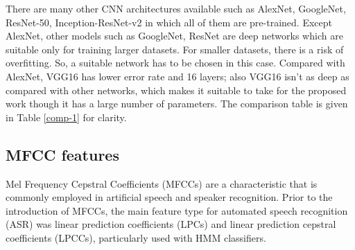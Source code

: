 \documentclass[pdflatex]{sn-jnl}%
\theoremstyle{thmstyleone}%
\theoremstyle{thmstyletwo}%
\theoremstyle{thmstylethree}%
\begin{document}
There are many other CNN architectures available such as AlexNet, GoogleNet, ResNet-50, Inception-ResNet-v2 in which all of them are pre-trained. Except AlexNet, other models such as GoogleNet, ResNet are deep networks which are suitable only for training larger datasets. For smaller datasets, there is a risk of overfitting. So, a suitable network has to be chosen in this case. Compared with AlexNet, VGG16 has lower error rate and 16 layers; also VGG16 isn't as deep as compared with other networks, which makes it suitable to take for the proposed work though it has a large number of parameters. The comparison table is given in Table \ref{comp-1} for clarity. 

\begin{table}[!htp]
	\caption{Comparision of CNN architectures}
	\begin{center}
		\label{comp-1}
	\end{center}
\end{table}

\subsection{MFCC features}
Mel Frequency Cepstral Coefficients (MFCCs) are a characteristic that is commonly employed in artificial speech and speaker recognition.
Prior to the introduction of MFCCs, the main feature type for automated speech recognition (ASR) was linear prediction coefficients (LPCs) and linear prediction cepstral coefficients (LPCCs), particularly used with HMM classifiers. 
\end{document}
